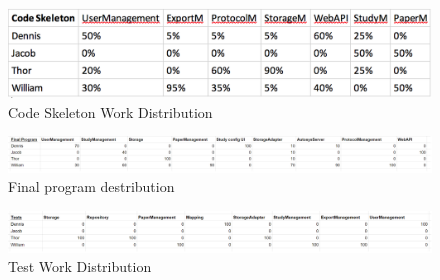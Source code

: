\begin{figure}[H]
	\centering
	\includegraphics[width=150mm]{image/skeletontimetable}
	\caption{Code Skeleton Work Distribution}
	\label{fig:codeskeleton} %
\end{figure}

\begin{figure}[H]
	\centering
	\includegraphics[width=150mm]{image/mainProgramtable}
	\caption{Final program destribution}
	\label{fig:MainProgram} 
\end{figure}

\begin{figure}[H]
	\centering
	\includegraphics[width=150mm]{image/TestTable}
	\caption{Test Work Distribution}
	\label{fig:TestWord} %
\end{figure}